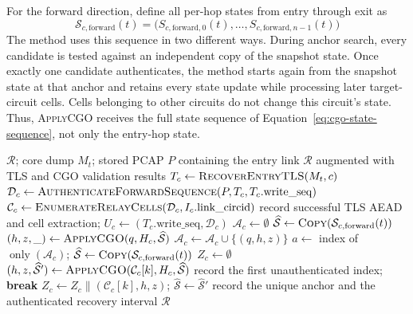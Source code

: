 \documentclass[10pt,a4paper]{article}
\begin{document}
For the forward direction, define all per-hop states from entry through exit as
\begin{equation}
\mathcal{S}_{c,\mathrm{forward}}(t)=
\bigl(S_{c,\mathrm{forward},0}(t),\ldots,
S_{c,\mathrm{forward},n-1}(t)\bigr)
\label{eq:cgo-state-sequence}
\end{equation}
The method uses this sequence in two different ways. During anchor search, every candidate is tested against an independent copy of the snapshot state. Once exactly one candidate authenticates, the method starts again from the snapshot state at that anchor and retains every state update while processing later target-circuit cells. Cells belonging to other circuits do not change this circuit's state. Thus, \textsc{ApplyCGO} receives the full state sequence of Equation~\eqref{eq:cgo-state-sequence}, not only the entry-hop state.

\begin{algorithm}[H]
\caption{Post-acquisition traffic recovery by sequential TLS and CGO processing}
\label{alg:traffic-recovery}
\small
\begin{algorithmic}[1]
\Require $\mathcal{R}$; core dump $M_t$; stored PCAP $P$ containing the entry link
\Ensure $\mathcal{R}$ augmented with TLS and CGO validation results
  \State $T_c\gets\Call{RecoverEntryTLS}{M_t,c}$
    \State $\mathcal{D}_c\gets\Call{AuthenticateForwardSequence}{P,T_c,T_c.\mathrm{write\_seq}}$
    \State $\mathcal{C}_c\gets\Call{EnumerateRelayCells}{\mathcal{D}_c,I_c.\mathrm{link\_circid}}$
      \State record successful TLS AEAD and cell extraction; $U_c\gets(T_c.\mathrm{write\_seq},\mathcal{D}_c)$
      \State $\mathcal{A}_c\gets\emptyset$
        \State $\widehat{\mathcal{S}}\gets\Call{Copy}{\mathcal{S}_{c,\mathrm{forward}}(t)}$
        \State $(h,z,\_)\gets\Call{ApplyCGO}{q,H_c,\widehat{\mathcal{S}}}$
          \State $\mathcal{A}_c\gets\mathcal{A}_c\cup\{(q,h,z)\}$
        \EndIf
      \EndFor
        \State $a\gets$ index of $\operatorname{only}(\mathcal{A}_c)$; $\widehat{\mathcal{S}}\gets\Call{Copy}{\mathcal{S}_{c,\mathrm{forward}}(t)}$
        \State $Z_c\gets\emptyset$
          \State $(h,z,\widehat{\mathcal{S}}')\gets\Call{ApplyCGO}{\mathcal{C}_c[k],H_c,\widehat{\mathcal{S}}}$
            \State record the first unauthenticated index; \textbf{break}
          \EndIf
          \State $Z_c\gets Z_c\mathbin{\|}(\mathcal{C}_c[k],h,z)$; $\widehat{\mathcal{S}}\gets\widehat{\mathcal{S}}'$
        \EndFor
        \State record the unique anchor and the authenticated recovery interval
      \EndIf
    \EndIf
  \EndIf
\EndFor
\State \Return $\mathcal{R}$
\end{algorithmic}
\end{algorithm}
\end{document}
